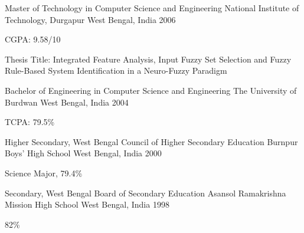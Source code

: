 

\begin{cventries}

  \cventry
    {Master of Technology in Computer Science and Engineering} %
    {National Institute of Technology, Durgapur} %
    {West Bengal, India} %
    {2006} %
    {
      \begin{cvitems} %
        \item {CGPA: 9.58/10} %
        \item {Thesis Title: Integrated Feature Analysis, Input Fuzzy Set Selection and Fuzzy Rule-Based System Identification in a Neuro-Fuzzy Paradigm} %
      \end{cvitems}
    }

  \cventry
    {Bachelor of Engineering in Computer Science and Engineering} %
    {The University of Burdwan} %
    {West Bengal, India} %
    {2004} %
    {
      \begin{cvitems} %
        \item {TCPA: 79.5\%} %
      \end{cvitems}
    }

  \cventry
    {Higher Secondary, West Bengal Council of Higher Secondary Education} %
    {Burnpur Boys' High School} %
    {West Bengal, India} %
    {2000} %
    {
      \begin{cvitems} %
        \item {Science Major, 79.4\%} %
      \end{cvitems}
    }

  \cventry
    {Secondary, West Bengal Board of Secondary Education} %
    {Asansol Ramakrishna Mission High School} %
    {West Bengal, India} %
    {1998} %
    {
      \begin{cvitems} %
        \item {82\%} %
      \end{cvitems}
    }

\end{cventries}
